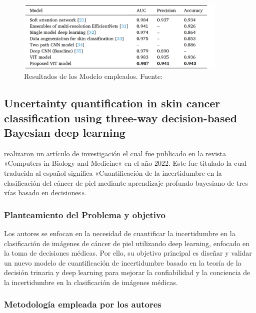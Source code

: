 \begin{figure}[h]
	\begin{center}
		\includegraphics[width=0.9\textwidth]{2/figuras/An_improved_transformer_network _imagen_01.png}
		\caption{Resultados de los Modelo empleados. Fuente: \cite{xin2022improved}}
		\label{1:fig}
	\end{center}
\end{figure}




\subsection{Uncertainty quantification in skin cancer classification using three-way decision-based Bayesian deep learning \citep*{abdar2021uncertainty}}
\citeauthor{abdar2021uncertainty} realizaron un artículo de investigación el cual fue publicado en la revista «Computers in Biology and Medicine» en el año 2022. Este fue titulado  la cual traducida al español significa «Cuantificación de la incertidumbre en la clasificación del cáncer de piel mediante aprendizaje profundo bayesiano de tres vías basado en decisiones».
\subsubsection{Planteamiento del Problema y objetivo}
Los autores se enfocan en la necesidad de cuantificar la incertidumbre en la clasificación de imágenes de cáncer de piel utilizando deep learning, enfocado en la toma de decisiones médicas. Por ello, su objetivo principal es diseñar y validar un nuevo modelo de cuantificación de incertidumbre basado en la teoría de la decisión trinaria y deep learning  para mejorar la confiabilidad y la conciencia de la incertidumbre en la clasificación de imágenes médicas.

\subsubsection{Metodología empleada por los autores}
\newcommand{\TUQSone}{Recopilación de Datos: Los autores recopilaron dos conjuntos de datos de 2 partes: uno de Kaggle y otro del ISIC 2019. Los cuales se realizo un preprocesamiento para preparar las imágenes para su análisis.
}

